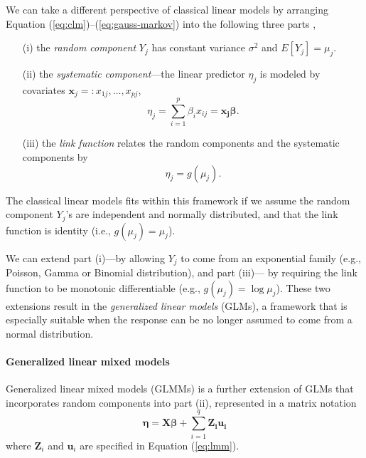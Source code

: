 We can take a different perspective of classical linear models by arranging Equation
(\ref{eq:clm})--(\ref{eq:gauss-markov}) into the following three parts \citep[Chapter
2]{mccullagh1989generalized}, 
\begin{enumerate}
	\item[(i)] the \textit{random component} $Y_j$ has constant variance $\sigma^2$ and
	$E[ Y_j]= \mu_j$.
	\item[(ii)] the \textit{systematic component}---the linear predictor $\eta_j$ is modeled by
	covariates $\bm x_j =: x_{1j},\ldots, x_{pj}$, 
	\begin{equation}\label{eq:part2}
	\eta_j = \sum_{i=1}^p\beta_i x_{ij}=\bm {x_j\beta}.
	\end{equation}
	\item[(iii)] the \textit{link function} relates the random components and the systematic
	components by 
	\begin{equation}\label{eq:part3}
	\eta_j = g(\mu_j).
	\end{equation}
\end{enumerate}
The classical linear models fits within this framework if we assume the random component $Y_j$'s
are independent and normally distributed, and that the link function is identity (i.e., $g(\mu_j)=
\mu_j$).

We can extend part (i)---by allowing $Y_j$ to come from an exponential family (e.g., Poisson,
Gamma or Binomial distribution), and part (iii)--- by requiring the link function to be monotonic
differentiable (e.g., $g(\mu_j)= \log \mu_j$). These two extensions result in the
\textit{generalized linear models} (GLMs), a framework that is especially suitable when the response
can be no longer assumed to come from a normal distribution.


\paragraph{Generalized linear mixed models}\label{para:glmm}
Generalized linear mixed models (GLMMs) is a further extension of GLMs that incorporates random
components into part (ii), represented in a matrix notation
\begin{equation}\label{eq:q5}
\bm \eta = \bm {X\beta} + \sum_{i=1}^q\bm {Z_iu_i}
\end{equation}
where  $\bm Z_i$ and $\bm u_i$ are specified in Equation (\ref{eq:lmm}). 

